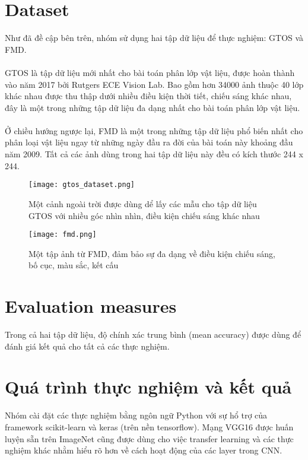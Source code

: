 \section{Dataset}
Như đã đề cập bên trên, nhóm sử dụng hai tập dữ liệu để thực nghiệm: GTOS và FMD. 
\paragraph*{}
GTOS là tập dữ liệu mới nhất cho bài toán phân lớp vật liệu, được hoàn thành vào năm 2017 bởi Rutgers ECE Vision Lab. Bao gồm hơn 34000 ảnh thuộc 40 lớp khác nhau được thu thập dưới nhiều điều kiện thời tiết, chiếu sáng khác nhau, đây là một trong những tập dữ liệu đa dạng nhất cho bài toán phân lớp vật liệu.
\paragraph*{}
Ở chiều hướng ngược lại, FMD là một trong những tập dữ liệu phổ biến nhất cho phân loại vật liệu ngay từ những ngày đầu ra đời của bài toán này khoảng đầu năm 2009. Tất cả các ảnh dùng trong hai tập dữ liệu này đều có kích thước 244 x 244.

\begin{figure}[h!]
	\centering
	\captionsetup{width=0.7\textwidth}
    \texttt{[image: gtos\_dataset.png]}
	\caption{Một cảnh ngoài trời được dùng dể lấy các mẫu cho tập dữ liệu GTOS với nhiều góc nhìn nhìn, điều kiện chiếu sáng khác nhau \cite{xue2017differential}}
	\label{fig:gtos_dataset}
\end{figure}

\begin{figure}[h!]
\centering
\captionsetup{width=0.7\textwidth}
\texttt{[image: fmd.png]}
\caption{Một tập ảnh từ FMD, đảm bảo sự đa dạng về điều kiện chiếu sáng, bố cục, màu sắc, kết cấu}
\label{fig:fmd}
\end{figure}

\section{Evaluation measures}
Trong cả hai tập dữ liệu, độ chính xác trung bình (mean accuracy) được dùng để đánh giá kết quả cho tất cả các thực nghiệm.

\section{Quá trình thực nghiệm và kết quả}
Nhóm cài đặt các thực nghiệm bằng ngôn ngữ Python với sự hổ trợ của framework scikit-learn và keras (trên nền tensorflow). Mạng VGG16 được huấn luyện sẵn trên ImageNet cũng được dùng cho việc transfer learning và các thực nghiệm khác nhằm hiểu rõ hơn về cách hoạt động của các layer trong CNN.

